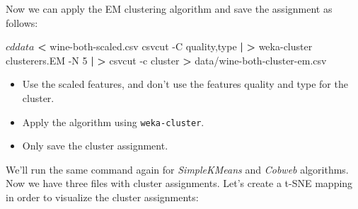 \documentclass[
]{book}
\newenvironment{Shaded}{\begin{snugshade}}{\end{snugshade}}
\newcommand{\BuiltInTok}[1]{#1}
\newcommand{\CommentTok}[1]{\textcolor[rgb]{0.56,0.35,0.01}{\textit{#1}}}
\newcommand{\ExtensionTok}[1]{#1}
\newcommand{\FunctionTok}[1]{\textcolor[rgb]{0.00,0.00,0.00}{#1}}
\newcommand{\KeywordTok}[1]{\textcolor[rgb]{0.13,0.29,0.53}{\textbf{#1}}}
\newcommand{\NormalTok}[1]{#1}
\newcommand{\OperatorTok}[1]{\textcolor[rgb]{0.81,0.36,0.00}{\textbf{#1}}}
\newcommand{\StringTok}[1]{\textcolor[rgb]{0.31,0.60,0.02}{#1}}
\newcommand{\VariableTok}[1]{\textcolor[rgb]{0.00,0.00,0.00}{#1}}
\providecommand{\tightlist}{%
  \setlength{\itemsep}{0pt}\setlength{\parskip}{0pt}}
\theoremstyle{definition}
\theoremstyle{definition}
\theoremstyle{definition}
\theoremstyle{remark}
\begin{document}
\begin{Shaded}
\end{Shaded}

Now we can apply the EM clustering algorithm and save the assignment as follows:

\begin{Shaded}
\begin{Highlighting}[]
\NormalTok{$ }\BuiltInTok{cd}\NormalTok{ data}
\NormalTok{$ }\OperatorTok{<} \ExtensionTok{wine-both-scaled.csv}\NormalTok{ csvcut -C quality,type }\KeywordTok{|}          
\OperatorTok{>} \ExtensionTok{weka-cluster}\NormalTok{ clusterers.EM -N 5 }\KeywordTok{|}                        
\OperatorTok{>} \ExtensionTok{csvcut}\NormalTok{ -c cluster }\OperatorTok{>}\NormalTok{ data/wine-both-cluster-em.csv        }
\end{Highlighting}
\end{Shaded}

\begin{itemize}
\tightlist
\item
  Use the scaled features, and don't use the features quality and type for the cluster.
\item
  Apply the algorithm using \texttt{weka-cluster}.
\item
  Only save the cluster assignment.
\end{itemize}

We'll run the same command again for \emph{SimpleKMeans} and \emph{Cobweb} algorithms. Now we have three files with cluster assignments. Let's create a t-SNE mapping in order to visualize the cluster assignments:

\begin{Shaded}
\end{Shaded}
\end{document}
